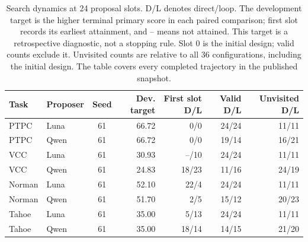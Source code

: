 \begin{table}[htbp]
\centering\small
\setlength{\tabcolsep}{4pt}
\begin{tabularx}{\linewidth}{@{}Xlcrrrr@{}}
\toprule
Task & Proposer & Seed & Dev. target & First slot D/L & Valid D/L & Unvisited D/L \\
\midrule
PTPC & Luna & 61 & 66.72 & 0/0 & 24/24 & 11/11 \\
PTPC & Qwen & 61 & 66.72 & 0/0 & 19/14 & 16/21 \\
VCC & Luna & 61 & 30.93 & --/10 & 24/24 & 11/11 \\
VCC & Qwen & 61 & 24.83 & 18/23 & 11/16 & 24/19 \\
Norman & Luna & 61 & 52.10 & 22/4 & 24/24 & 11/11 \\
Norman & Qwen & 61 & 51.70 & 2/5 & 15/12 & 20/23 \\
Tahoe & Luna & 61 & 35.00 & 5/13 & 24/24 & 11/11 \\
Tahoe & Qwen & 61 & 35.00 & 18/14 & 14/15 & 21/20 \\
\bottomrule
\end{tabularx}
\caption{Search dynamics at 24 proposal slots. D/L denotes direct/loop. The development target is the higher terminal primary score in each paired comparison; first slot records its earliest attainment, and -- means not attained. This target is a retrospective diagnostic, not a stopping rule. Slot 0 is the initial design; valid counts exclude it. Unvisited counts are relative to all 36 configurations, including the initial design. The table covers every completed trajectory in the published snapshot.}
\label{tab:core-search-dynamics}
\end{table}
